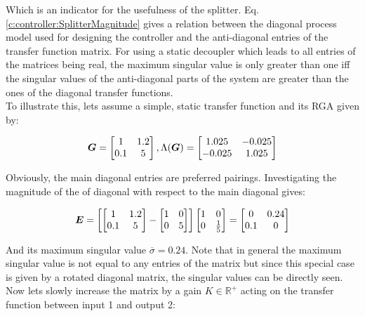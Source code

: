 Which is an indicator for the usefulness of the splitter. Eq.\ref{c:controller:SplitterMagnitude} gives a relation between the diagonal process model used for designing the controller and the anti-diagonal entries of the transfer function matrix. For using a static decoupler which leads to all entries of the matrices being real, the maximum singular value is only greater than one iff the singular values of the anti-diagonal parts of the system are greater than the ones of the diagonal transfer functions.\\

To illustrate this, lets assume a simple, static transfer function and its RGA given by:

\begin{align*}
\mbox{\boldmath$G$} = \begin{bmatrix}
1 & 1.2 \\
0.1 & 5
\end{bmatrix}, \Lambda(\mbox{\boldmath$G$}) = \begin{bmatrix}
1.025 & -0.025 \\
-0.025 & 1.025
\end{bmatrix}
\end{align*}

Obviously, the main diagonal entries are preferred pairings. Investigating the magnitude of the of diagonal with respect to the main diagonal gives:

\begin{align*}
\mbox{\boldmath$E$} = \left[ \begin{bmatrix}
1 & 1.2 \\ 0.1 & 5
\end{bmatrix} - \begin{bmatrix}
1 & 0 \\ 0 & 5
\end{bmatrix} \right]\begin{bmatrix}
1 & 0 \\ 0 & \frac{1}{5}
\end{bmatrix} = \begin{bmatrix}
0 & 0.24 \\ 0.1 & 0
\end{bmatrix} 
\end{align*}

And its maximum singular value $\overline{\sigma} = 0.24$. Note that in general the maximum singular value is not equal to any entries of the matrix but since this special case is given by a rotated diagonal matrix, the singular values can be directly seen. Now lets slowly increase the matrix by a gain $K \in \mathbb{R}^+$ acting on the transfer function between input 1 and output 2:


